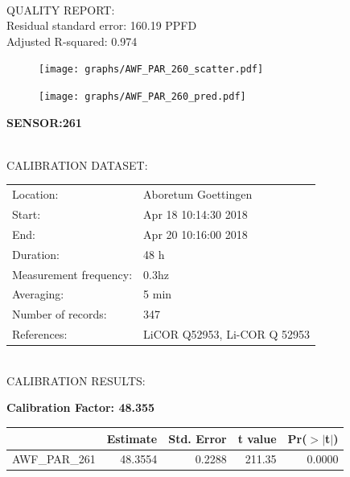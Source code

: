 \documentclass[oneside]{report}
\begin{document}
\hrulefill\\
QUALITY REPORT:\\
Residual standard error: 160.19 PPFD\\
Adjusted R-squared: 0.974



\begin{figure}[H]
  \centering
  \texttt{[image: graphs/AWF\_PAR\_260\_scatter.pdf]}
\end{figure}




\begin{figure}[H]
  \centering
  \texttt{[image: graphs/AWF\_PAR\_260\_pred.pdf]}
\end{figure}

\pagebreak


\begin{center}
\large{\textbf{SENSOR:261}}\\
\end{center}

\hrulefill\\
CALIBRATION DATASET:\\
\begin{table}[h!]
  \centering
  \label{tab:table1}
  \begin{tabular}{ll}
    Location: & Aboretum Goettingen\\ 
    
    
    Start:  & Apr 18 10:14:30 2018 \\
    End:   & Apr 20 10:16:00 2018\\ 
    Duration: & 48 h\\
    Measurement frequency: & 0.3hz\\
    Averaging:  &5 min\\
    Number of records: & 347 \\
    References: & LiCOR Q52953, Li-COR Q 52953 \\
  \end{tabular}
\end{table}

\hrulefill\\
CALIBRATION RESULTS:\\


\begin{center}
\textbf{\large{Calibration Factor: 48.355}}\\
\end{center}
\begin{table}[ht]
\centering
\begin{tabular}{rrrrr}
  \hline
 & Estimate & Std. Error & t value & Pr($>$$|$t$|$) \\ 
  \hline
AWF\_PAR\_261 & 48.3554 & 0.2288 & 211.35 & 0.0000 \\ 
   \hline
\end{tabular}
\end{table}
\end{document}
